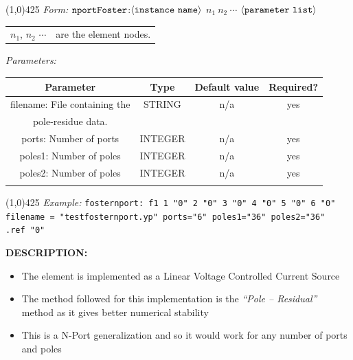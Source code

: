 \documentclass{article}
\begin{document}
\hrulefill\linethickness{0.5mm}\line(1,0){425} \normalsize
\newline
\textit{Form:}
$\tt nportFoster$:$\langle \tt{instance\ name}\rangle$ $n_1\ n_2\
\cdots$ $\langle \tt{parameter\ list}\rangle$
\newline
\begin{tabular}{r l}
$n_1$, $n_2$ $\cdots$ & are the element nodes. \\
\end{tabular}
\newline
\textit{Parameters:}
\begin{table}[H]
\begin{tabular}{|c|c|c|c|}
\hline
Parameter&Type&Default value&Required?\\
\hline
filename: File containing the & STRING & n/a & yes\\
pole-residue data. & & & \\
\hline
ports: Number of ports & INTEGER & n/a & yes\\
\hline
poles1: Number of poles & INTEGER & n/a & yes\\
\hline
poles2: Number of poles & INTEGER & n/a & yes\\
\par
\hline
\end{tabular}
\end{table}
\noindent\linethickness{0.5mm}\line(1,0){425}
\newline
\textit{Example:}
\newline
\texttt{fosternport:\ f1\ 1\ "0"\ 2\ "0"\ 3\ "0"\ 4\ "0"\ 5\
"0"\ 6\ "0"\\
filename = "testfosternport.yp" ports="6" poles1="36" poles2="36"\\
.ref "0"}


\textbf{DESCRIPTION:}

\begin{itemize}
\item The element is implemented as a Linear Voltage Controlled Current Source
\item The method followed for this implementation is the \textit{``Pole -- Residual'' }method as it gives better numerical stability
\item This is a N-Port generalization and so it would work for any number of ports and poles
\end{itemize}
\end{document}
